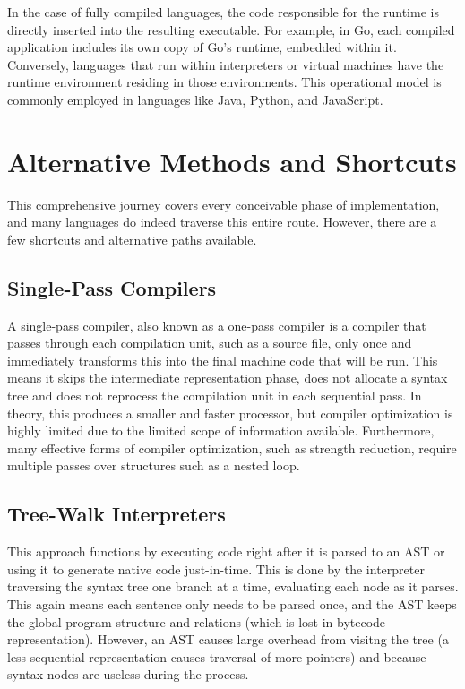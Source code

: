 {In the case of fully compiled languages, the code responsible for the runtime is directly inserted into the resulting executable. For example, in Go, each compiled application includes its own copy of Go's runtime, embedded within it. Conversely, languages that run within interpreters or virtual machines have the runtime environment residing in those environments. This operational model is commonly employed in languages like Java, Python, and JavaScript.

\section{Alternative Methods and Shortcuts}

This comprehensive journey covers every conceivable phase of implementation, and many languages do indeed traverse this entire route. However, there are a few  shortcuts and alternative paths available.

\subsection{Single-Pass Compilers}

A single-pass compiler, also known as a one-pass compiler is a compiler that passes through each compilation unit, such as a source file, only once and immediately transforms this into the final machine code that will be run. This means it skips the intermediate representation phase, does not allocate a syntax tree and does not reprocess the compilation unit in each sequential pass. In theory, this produces a smaller and faster processor, but compiler optimization is highly limited due to the limited scope of information available. Furthermore, many effective forms of compiler optimization, such as strength reduction, require multiple passes over structures such as a nested loop. 

\subsection{Tree-Walk Interpreters}

This approach functions by executing code right after it is parsed to an AST or using it to generate native code just-in-time. This is done by the interpreter traversing the syntax tree one branch at a time, evaluating each node as it parses. This again means each sentence only needs to be parsed once, and the \ac{AST} keeps the global program structure and relations (which is lost in bytecode representation). However, an \ac{AST} causes large overhead from visitng the tree (a less sequential representation causes traversal of more pointers) and because syntax nodes are useless during the process.

}
